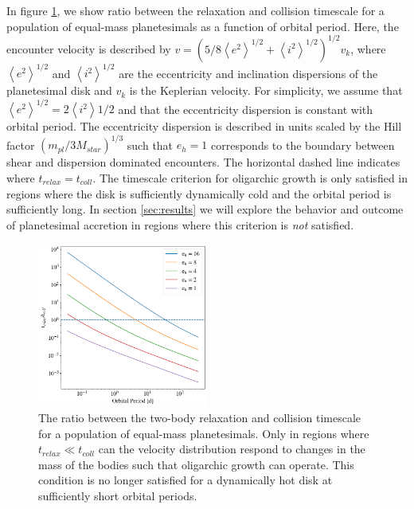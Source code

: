 \documentclass[twocolumn]{aastex63}
\begin{document}
In figure \ref{fig:timescales}, we show ratio between the relaxation and collision timescale for a population of equal-mass planetesimals as a function of orbital period. Here, the encounter velocity is described by $v = \left( 5/8 \left< e^2 \right>^{1/2} + \left< i^2 \right>^{1/2} \right)^{1/2} v_{k}$, where $\left< e^2 \right>^{1/2}$ and $\left< i^2 \right>^{1/2}$ are the eccentricity and inclination dispersions of the planetesimal disk and $v_{k}$ is the Keplerian velocity. For simplicity, we assume that $\left< e^2 \right>^{1/2} = 2\left< i^2 \right>{1/2}$ \citep{ida93a} and that the eccentricity dispersion is constant with orbital period. The eccentricity dispersion is described in units scaled by the Hill factor $\left( m_{pl}/ 3 M_{star} \right)^{1/3}$ such that $e_{h} = 1$ corresponds to the boundary between shear and dispersion dominated encounters. The horizontal dashed line indicates where $t_{relax} = t_{coll}$. The timescale criterion for oligarchic growth is only satisfied in regions where the disk is sufficiently dynamically cold and the orbital period is sufficiently long. In section \ref{sec:results} we will explore the behavior and outcome of planetesimal accretion in regions where this criterion is \textit{not} satisfied. 

\begin{figure}
\begin{center}
    \includegraphics[width=0.5\textwidth]{figures/timescales.png}
    \caption{The ratio between the two-body relaxation and collision timescale for a population of equal-mass planetesimals. Only in regions where $t_{relax} \ll t_{coll}$ can the velocity distribution respond to changes in the mass of the bodies such that oligarchic growth can operate. This condition is no longer satisfied for a dynamically hot disk at sufficiently short orbital periods.\label{fig:timescales}}
\end{center}
\end{figure}
\end{document}
